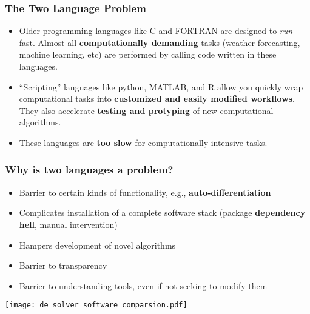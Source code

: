 \documentclass[t]{beamer}
\newcommand\df{\bf\color{Maroon}}
\begin{document}



\begin{frame}
  \frametitle{The Two Language Problem}
  \begin{itemize}

\item   Older programming languages like C and FORTRAN are designed to {\em
    run} fast. Almost all {\df computationally demanding} tasks
  (weather forecasting, machine learning, etc) are performed by
  calling code written in these languages. \pause
  
\item ``Scripting'' languages like python, MATLAB, and R allow you
  quickly wrap computational tasks into {\df customized and easily
    modified workflows}. They also accelerate {\df testing and
    protyping} of new computational algorithms.\pause

\item These languages are {\df too slow} for computationally intensive tasks.
\end{itemize}
\end{frame}


  
\begin{frame}
  \frametitle{Why  is two languages a problem?}
  \begin{itemize}
    \item Barrier to certain kinds of functionality, e.g., {\df auto-differentiation}
    \item Complicates installation of a complete software stack
    (package {\df dependency hell}, manual intervention)
  \item Hampers development of novel algorithms
  \item Barrier to transparency
  \item Barrier to understanding tools, even if not seeking to modify them
  \end{itemize}
\end{frame}

\begin{frame}[plain]
     \texttt{[image: de\_solver\_software\_comparsion.pdf]}
\end{frame}
\end{document}
